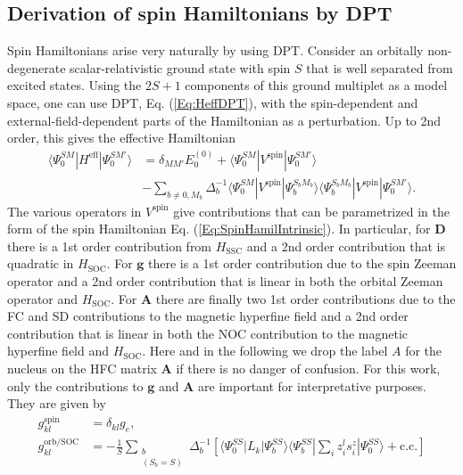 \subsection{Derivation of spin Hamiltonians by DPT}
\label{Sec:DPT2_SHparameters}
Spin Hamiltonians arise very naturally by using DPT. Consider an orbitally non-de\-gen\-er\-ate scalar-relativistic ground state with spin $S$ that is well separated from excited states. Using the $2S+1$ components of this ground multiplet as a model space, one can use DPT, Eq. (\ref{Eq:HeffDPT}), with the spin-dependent and external-field-dependent parts of the Hamiltonian as a perturbation. Up to 2nd order, this gives the effective Hamiltonian
\begin{equation}
\label{Eq:SH_DPT2_Heff}
\begin{split}
\langle \Psi_0^{SM} | H^\text{eff} | \Psi_0^{SM'}\rangle &= \delta_{MM'}E_0^{(0)} + \langle \Psi_0^{SM} | V^\text{spin} | \Psi_0^{SM'}\rangle \\
&- \sum_{b\neq 0, M_b}\Delta_b^{-1}\langle \Psi_0^{SM} | V^\text{spin} | \Psi_b^{S_b M_b}\rangle \langle \Psi_b^{S_b M_b} | V^\text{spin} | \Psi_0^{SM'}\rangle.
\end{split}
\end{equation}
The various operators in $V^\text{spin}$ give contributions that can be parametrized in the form of the spin Hamiltonian Eq. (\ref{Eq:SpinHamilIntrinsic}).\cite{NeeseS_2003_345} In particular, for $\mathbf{D}$ there is a 1st order contribution from $H_\text{SSC}$ and a 2nd order contribution that is quadratic in $H_\text{SOC}$. For $\mathbf{g}$ there is a 1st order contribution due to the spin Zeeman operator and a 2nd order contribution that is linear in both the orbital Zeeman operator and $H_\text{SOC}$. For $\mathbf{A}$ there are finally two 1st order contributions due to the FC and SD contributions to the magnetic hyperfine field and a 2nd order contribution that is linear in both the NOC contribution to the magnetic hyperfine field and $H_\text{SOC}$. Here and in the following we drop the label $A$ for the nucleus on the HFC matrix $\mathbf{A}$ if there is no danger of confusion. For this work, only the contributions to $\mathbf{g}$ and $\mathbf{A}$ are important for interpretative purposes. They are given by
\begin{align}
g_{kl}^\text{spin} &= \delta_{kl}g_e, \label{Eq:g_spin}\\ 
g_{kl}^{\text{orb/SOC}} &= - \frac{1}{S} \sum_{\substack{b \\ (S_b = S)}}\Delta_b^{-1} \left[ \langle \Psi_0^{SS} | L_k | \Psi_b^{SS}\rangle \langle \Psi_b^{SS} | \sum_i z_i^l s_i^z | \Psi_0^{SS} \rangle + \text{c.c.}\right] \label{Eq:g_orb_SOC}
\end{align}
